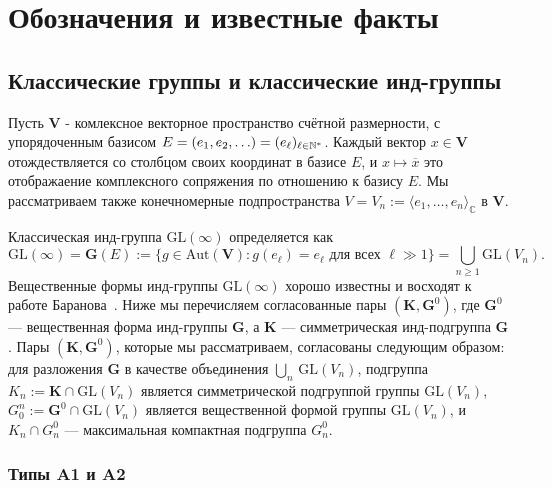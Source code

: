 \documentclass{amsart}
\theoremstyle{definition}
\newcommand{\NN}{\mathbb{N}^*}
\begin{document}
\section{Обозначения и известные факты}

\label{S2}



\subsection{Классические группы и классические инд-группы}

\label{S2.1}

Пусть $\mathbf{V}$ - комлексное векторное пространство счётной размерности, с упорядоченным базисом
$E=  (e_1,e_2,\ldots) \\ =  (e_\ell)_{\ell\in \NN}$.
Каждый вектор $x\in\mathbf{V}$ отождествляется со столбцом своих координат в базисе $E$,
и $x\mapsto \overline{x}$ это отображаение комплексного сопряжения  по отношению к базису $E$.
Мы рассматриваем также конечномерные подпространства $V=V_n:=\langle e_1,\ldots,e_n\rangle_\mathbb{C}$ в $\mathbf{V}$.

Классическая инд-группа $\mathrm{GL}(\infty)$ определяется как
\[\mathrm{GL}(\infty)=\mathbf{G}(E):=\{g\in\mathrm{Aut}(\mathbf{V}):g(e_\ell)=e_\ell\mbox{ для всех $\ell\gg 1$}\}=\bigcup_{n\geq 1}\mathrm{GL}(V_n).\]
%
Вещественные формы инд-группы $\mathrm{GL}(\infty)$ хорошо известны и восходят к работе Баранова~\cite{Baranov}.  Ниже мы перечисляем согласованные пары $(\mathbf{K},\mathbf{G}^0)$, где $\textbf{G}^0$ --- вещественная форма инд-группы $\mathbf{G}$, а $\mathbf{K}$  --- симметрическая инд-подгруппа  $\mathbf{G}$. Пары $\left(\mathbf{K},\mathbf{G}^0\right)$, которые мы рассматриваем, согласованы следующим образом: для разложения $\mathbf{G}$ в качестве объединения $\bigcup_n\,\mathrm{GL}\left(V_n\right)$, подгруппа $K_n:=\mathbf{K}\cap\mathrm{GL}\left(V_n\right)$ является симметрической подгруппой группы $\mathrm{GL}\left(V_n\right)$, $G_0^n:=\mathbf{G}^0\cap\mathrm{GL}\left(V_n\right)$ является вещественной формой группы $\mathrm{GL}\left(V_n\right)$, и $K_n\cap G_n^0$ --- максимальная компактная подгруппа $G_n^0$.

\subsubsection{Типы A1 и A2}
\label{S:A1A2}
\end{document}
